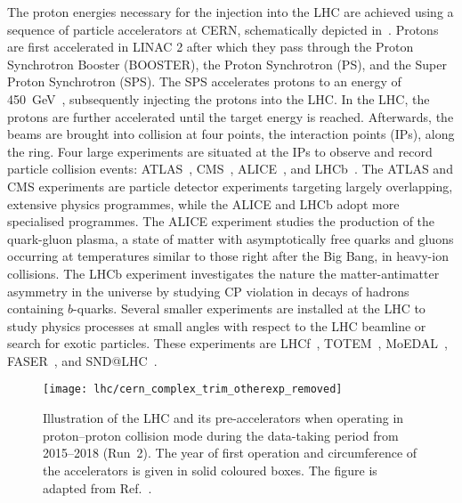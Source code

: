 The proton energies necessary for the injection into the LHC are achieved using
a sequence of particle accelerators at CERN, schematically depicted
in~. Protons are first accelerated in LINAC 2
after which they pass through the Proton Synchrotron Booster (BOOSTER), the
Proton Synchrotron (PS), and the Super Proton Synchrotron (SPS). The SPS
accelerates protons to an energy of \SI{450}{\GeV}~\cite{Evans:2008zzb},
subsequently injecting the protons into the LHC. In the LHC, the protons are
further accelerated until the target energy is reached. Afterwards, the beams
are brought into collision at four points, the interaction points (IPs), along
the ring. Four large experiments are situated at the IPs to observe and record
particle collision events: ATLAS~\cite{PERF-2007-01}, CMS~\cite{CMS-CMS-00-001},
ALICE~\cite{ALICE:2008ngc}, and LHCb~\cite{LHCb:2008vvz}. The ATLAS and CMS
experiments are particle detector experiments targeting largely overlapping,
extensive physics programmes, while the ALICE and LHCb adopt more specialised
programmes. The ALICE experiment studies the production of the quark-gluon
plasma, a state of matter with asymptotically free quarks and gluons occurring
at temperatures similar to those right after the Big Bang, in heavy-ion
collisions. The LHCb experiment investigates the nature the matter-antimatter
asymmetry in the universe by studying CP violation in decays of hadrons
containing $b$-quarks. Several smaller experiments are installed at the LHC to
study physics processes at small angles with respect to the LHC beamline or
search for exotic particles. These experiments are LHCf~\cite{LHCf:2008lfy},
TOTEM~\cite{TOTEM:2008lue}, MoEDAL~\cite{MoEDAL:2009jwa},
FASER~\cite{FASER:2019aik}, and SND@LHC~\cite{Boyarsky:2021moj}.

\begin{figure}[htbp]
  \centering

  \texttt{[image: lhc/cern\_complex\_trim\_otherexp\_removed]}

  \caption[Illustration of the LHC and its pre-accelerators.]{Illustration of
    the LHC and its pre-accelerators when operating in proton--proton collision
    mode during the data-taking period from 2015--2018 (Run~2). The year of
    first operation and circumference of the accelerators is given in solid
    coloured boxes. The figure is adapted from Ref.~\cite{Mobs:2684277}.}%
  \label{fig:cern_accelerator_complex}
\end{figure}


